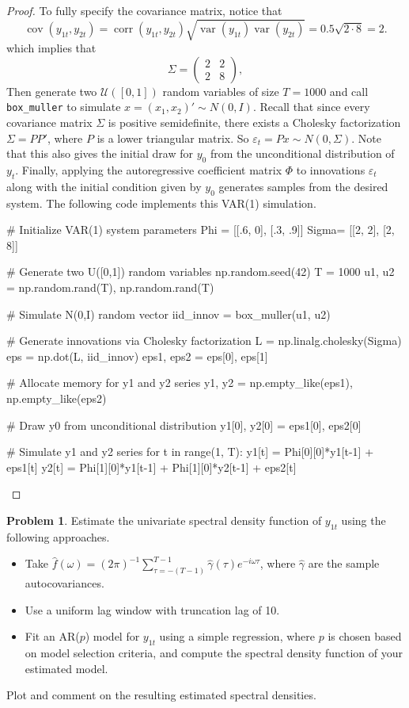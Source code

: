 \documentclass[oneside,reqno]{amsart}
\DeclareMathOperator{\var}{var}
\DeclareMathOperator{\cov}{cov}
\DeclareMathOperator{\corr}{corr}
\newcommand{\eps}{\varepsilon}
\theoremstyle{definition}
\newtheorem{prob}{Problem}
\begin{document}
\begin{proof}
To fully specify the covariance matrix, notice that
\[
	\cov(y_{1t}, y_{2t}) =\corr(y_{1t}, y_{2t}) \sqrt{\var(y_{1t})\var(y_{2t})} = 0.5 \sqrt{2 \cdot 8} = 2.
\]
which implies that
\[
	\Sigma = \begin{pmatrix}
			2 & 2 \\
			2 & 8
	\end{pmatrix},
\] 
Then generate two $\mathcal U([0,1])$ random variables of size $T=1000$ and call \texttt{box_muller} to simulate $x = (x_1, x_2)' \sim N(0,I)$.  Recall that since every covariance matrix $\Sigma$ is positive semidefinite, there exists a Cholesky factorization $\Sigma = PP'$, where $P$ is a lower triangular matrix. So $\eps_t = P x \sim N(0, \Sigma)$. Note that this also gives the initial draw for $y_0$ from the unconditional distribution of $y_t$. Finally, applying the autoregressive coefficient matrix $\Phi$ to innovations $\eps_t$ along with the initial condition given by $y_0$ generates samples from the desired system. The following code implements this VAR(1) simulation.

\begin{python3code}
# Initialize VAR(1) system parameters
Phi = [[.6, 0], [.3, .9]]
Sigma= [[2, 2], [2, 8]]

# Generate two U([0,1]) random variables 
np.random.seed(42)
T = 1000
u1, u2 = np.random.rand(T), np.random.rand(T)

# Simulate N(0,I) random vector 
iid_innov = box_muller(u1, u2)

# Generate innovations via Cholesky factorization  
L = np.linalg.cholesky(Sigma)
eps = np.dot(L, iid_innov)
eps1, eps2 = eps[0], eps[1]

# Allocate memory for y1 and y2 series 
y1, y2 = np.empty_like(eps1), np.empty_like(eps2)

# Draw y0 from unconditional distribution 
y1[0], y2[0] = eps1[0], eps2[0]

# Simulate y1 and y2 series  
for t in range(1, T):
    y1[t] = Phi[0][0]*y1[t-1] + eps1[t]
    y2[t] = Phi[1][0]*y1[t-1] + Phi[1][0]*y2[t-1] + eps2[t]
\end{python3code}
\end{proof}


\begin{prob}
Estimate the univariate spectral density function of $y_{1t}$ using the following approaches.
\begin{itemize}
\item
Take $\hat f(\omega) = (2\pi)^{-1} \sum_{\tau=-(T-1)}^{T-1} \hat \gamma(\tau) e^{-i \omega \tau}$, where $\hat \gamma$ are the sample autocovariances. 
\item
Use a uniform lag window with truncation lag of 10.
\item
Fit an AR($p$) model for $y_{1t}$ using a simple regression, where $p$ is chosen based on model selection criteria, and compute the spectral density function of your estimated model.
\end{itemize}
Plot and comment on the resulting estimated spectral densities.
\end{prob}
\end{document}
